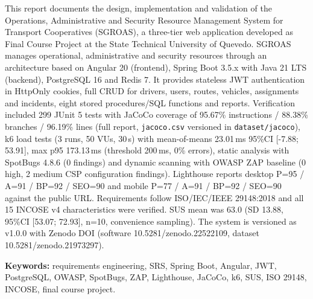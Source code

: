 This report documents the design, implementation and validation of the Operations, Administrative and Security Resource Management System for Transport Cooperatives (SGROAS), a three-tier web application developed as Final Course Project at the State Technical University of Quevedo. SGROAS manages operational, administrative and security resources through an architecture based on Angular 20 (frontend), Spring Boot 3.5.x with Java 21 LTS (backend), PostgreSQL 16 and Redis 7. It provides stateless JWT authentication in HttpOnly cookies, full CRUD for drivers, users, routes, vehicles, assignments and incidents, eight stored procedures/SQL functions and reports. Verification included 299 JUnit 5 tests with JaCoCo coverage of 95.67\% instructions / 88.38\% branches / 96.19\% lines (full report, \texttt{jacoco.csv} versioned in \texttt{dataset/jacoco}), k6 load tests (3 runs, 50 VUs, 30\,s) with mean-of-means 23.01\,ms 95\%CI [-7.88; 53.91], max p95 173.13\,ms (threshold 200\,ms, 0\% errors), static analysis with SpotBugs 4.8.6 (0 findings) and dynamic scanning with OWASP ZAP baseline (0 high, 2 medium CSP configuration findings). Lighthouse reports desktop P=95 / A=91 / BP=92 / SEO=90 and mobile P=77 / A=91 / BP=92 / SEO=90 against the public URL. Requirements follow ISO/IEC/IEEE 29148:2018 and all 15 INCOSE v4 characteristics were verified. SUS mean was 63.0 (SD 13.88, 95\%CI [53.07; 72.93], n=10, convenience sampling). The system is versioned as v1.0.0 with Zenodo DOI (software 10.5281/zenodo.22522109, dataset 10.5281/zenodo.21973297).

\textbf{Keywords:} requirements engineering, SRS, Spring Boot, Angular, JWT, PostgreSQL, OWASP, SpotBugs, ZAP, Lighthouse, JaCoCo, k6, SUS, ISO 29148, INCOSE, final course project.
